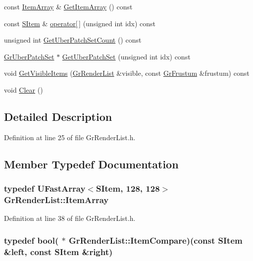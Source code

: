 \begin{CompactItemize}
\item 
const \hyperlink{class_u_fast_array}{ItemArray} \& \hyperlink{class_gr_render_list_784632f8e1b0b09ae34f2ccb06c3fac3}{GetItemArray} () const 
\item 
const \hyperlink{struct_gr_render_list_1_1_s_item}{SItem} \& \hyperlink{class_gr_render_list_c5c2ce6c9a0dffefad11be6a66560d1f}{operator\mbox{[}$\,$\mbox{]}} (unsigned int idx) const 
\item 
unsigned int \hyperlink{class_gr_render_list_4ec857347bb48be6ad445b60a96c230c}{GetUberPatchSetCount} () const 
\item 
\hyperlink{class_gr_uber_patch_set}{GrUberPatchSet} $\ast$ \hyperlink{class_gr_render_list_7c282cfed443280511a80ccd88f8304b}{GetUberPatchSet} (unsigned int idx) const 
\item 
void \hyperlink{class_gr_render_list_5715a8ea1fbcc22a26c0fe2bea0cd852}{GetVisibleItems} (\hyperlink{class_gr_render_list}{GrRenderList} \&visible, const \hyperlink{class_gr_frustum}{GrFrustum} \&frustum) const 
\item 
void \hyperlink{class_gr_render_list_a7f961a2ec3cfc7bebf4ee7157569081}{Clear} ()
\end{CompactItemize}


\subsection{Detailed Description}


Definition at line 25 of file GrRenderList.h.

\subsection{Member Typedef Documentation}
\hypertarget{class_gr_render_list_6726a5c2e28aa9e3834b122747353158}{
\subsubsection[{ItemArray}]{\setlength{\rightskip}{0pt plus 5cm}typedef {\bf UFastArray}$<${\bf SItem}, 128, 128$>$ {\bf GrRenderList::ItemArray}}}
\label{class_gr_render_list_6726a5c2e28aa9e3834b122747353158}




Definition at line 38 of file GrRenderList.h.\hypertarget{class_gr_render_list_8456ff8c0733596672fc7181c7838996}{
\subsubsection[{ItemCompare}]{\setlength{\rightskip}{0pt plus 5cm}typedef bool( $\ast$ {\bf GrRenderList::ItemCompare})(const {\bf SItem} \&{\bf left}, const {\bf SItem} \&{\bf right})}}
\label{class_gr_render_list_8456ff8c0733596672fc7181c7838996}


